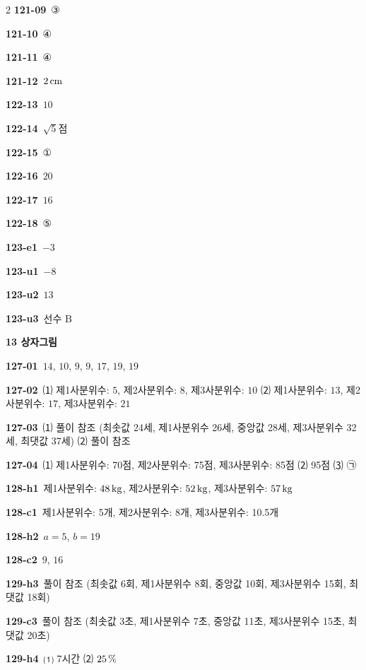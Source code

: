 \documentclass[10pt,a4paper]{article}
\newcommand{\pt}[1]{\mathrm{#1}}
\begin{document}
\begin{multicols}{2}
\noindent\textbf{121-09}\ ③\par
\noindent\textbf{121-10}\ ④\par
\noindent\textbf{121-11}\ ④\par
\noindent\textbf{121-12}\ $2\mkern3mu \mathrm{cm}$\par
\noindent\textbf{122-13}\ $10$\par
\noindent\textbf{122-14}\ $\sqrt{5}$점\par
\noindent\textbf{122-15}\ ①\par
\noindent\textbf{122-16}\ $20$\par
\noindent\textbf{122-17}\ $16$\par
\noindent\textbf{122-18}\ ⑤\par
\noindent\textbf{123-e1}\ $-3$\par
\noindent\textbf{123-u1}\ $-8$\par
\noindent\textbf{123-u2}\ $13$\par
\noindent\textbf{123-u3}\ 선수 $\pt{B}$\par
\noindent\textbf{13 상자그림}\par\smallskip
\noindent\textbf{127-01}\ $14$, $10$, $9$, $9$, $17$, $19$, $19$\par
\noindent\textbf{127-02}\ ⑴ 제1사분위수: $5$, 제2사분위수: $8$, 제3사분위수: $10$ ⑵ 제1사분위수: $13$, 제2사분위수: $17$, 제3사분위수: $21$\par
\noindent\textbf{127-03}\ ⑴ 풀이 참조 (최솟값 24세, 제1사분위수 26세, 중앙값 28세, 제3사분위수 32세, 최댓값 37세) ⑵ 풀이 참조\par
\noindent\textbf{127-04}\ ⑴ 제1사분위수: 70점, 제2사분위수: 75점, 제3사분위수: 85점 ⑵ 95점 ⑶ ㉠\par
\noindent\textbf{128-h1}\ 제1사분위수: $48\mkern3mu \mathrm{kg}$, 제2사분위수: $52\mkern3mu \mathrm{kg}$, 제3사분위수: $57\mkern3mu \mathrm{kg}$\par
\noindent\textbf{128-c1}\ 제1사분위수: 5개, 제2사분위수: 8개, 제3사분위수: 10.5개\par
\noindent\textbf{128-h2}\ $a=5$, $b=19$\par
\noindent\textbf{128-c2}\ $9$, $16$\par
\noindent\textbf{129-h3}\ 풀이 참조 (최솟값 6회, 제1사분위수 8회, 중앙값 10회, 제3사분위수 15회, 최댓값 18회)\par
\noindent\textbf{129-c3}\ 풀이 참조 (최솟값 3초, 제1사분위수 7초, 중앙값 11초, 제3사분위수 15초, 최댓값 20초)\par
\noindent\textbf{129-h4}\ ⑴ 7시간 ⑵ $25\mkern3mu \%$\par

\end{multicols}
\end{document}
